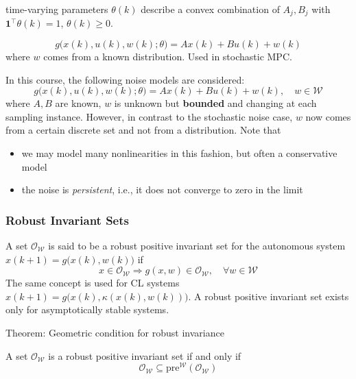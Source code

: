 time-varying parameters $\theta(k)$ describe a convex combination of $A_j , B_j$ with $\mathbf{1}^\top \theta(k) = 1$, $\theta(k) \geq 0$.

\newpar{}
\noindent
\begin{equation*}
    g\bigl(x(k), u(k), w(k); \theta\bigr) = Ax(k) + Bu(k) + w(k)
\end{equation*}
where $w$ comes from a known distribution. Used in stochastic MPC.

\newpar{}

In this course, the following noise models are considered:
\begin{equation*}
    g\bigl(x(k), u(k), w(k); \theta\bigr) = Ax(k) + Bu(k) + w(k), \quad w \in \mathcal{W}
\end{equation*}
where $A,B$ are known, $w$ is unknown but \textbf{bounded} and changing at each sampling instance. However, in contrast to the stochastic noise case, $w$ now comes from a certain discrete set and not from a distribution.
\newpar{}
Note that
\begin{itemize}
    \item we may model many nonlinearities in this fashion, but often a conservative model
    \item the noise is \textit{persistent}, i.e., it does not converge to zero in the limit
\end{itemize}

\subsubsection{Robust Invariant Sets}

A set $\mathcal{O}_\mathcal{W}$ is said to be a robust positive invariant set for the autonomous system $x(k + 1) = g\bigl(x(k), w(k)\bigr)$ if
\begin{equation*}
    x \in \mathcal{O}_\mathcal{W} \Rightarrow g(x, w) \in \mathcal{O}_\mathcal{W}, \quad \forall w \in \mathcal{W}
\end{equation*}
The same concept is used for CL systems $x(k+1)=g\bigl(x(k), \kappa(x(k), w(k))\bigr)$.
\newpar{}
A robust positive invariant set exists only for asymptotically stable systems.

\newpar{}

Theorem: Geometric condition for robust invariance

A set $\mathcal{O}_\mathcal{W}$ is a robust positive invariant set if and only if
\begin{equation*}
    \mathcal{O}_\mathcal{W} \subseteq \text{pre}^{\mathcal{W}}(\mathcal{O}_\mathcal{W})
\end{equation*}

